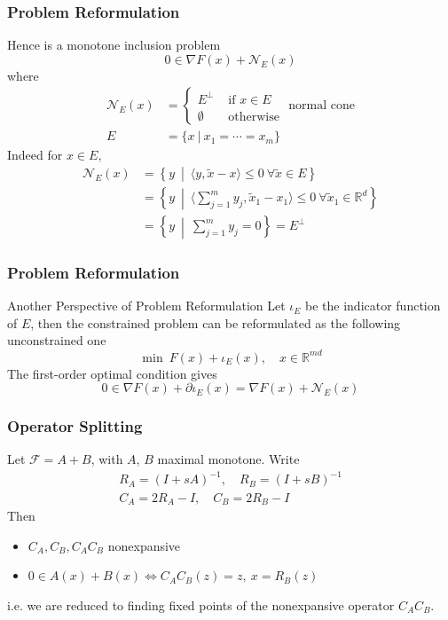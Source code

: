 
\begin{frame}
\frametitle{Problem Reformulation}

Hence is a monotone inclusion problem
$$0 \in \nabla F(x) + \mathcal{N}_E(x)$$
where
\begin{align*}
\mathcal{N}_E(x) & = \begin{cases} E^{\perp} & \text{ if } x \in E \\ \emptyset & \text{ otherwise } \end{cases} \text{normal cone} \\
E & = \{x \ |\ x_1 = \cdots = x_m\}
\end{align*}
Indeed for $x\in E$,
\begin{align*}
\mathcal{N}_E(x) & = \left\{ y \ \middle|\ \langle y, \widetilde{x} - x \rangle \leqslant 0 \ \forall \widetilde{x} \in E \right\} \\
& = \left\{ y \ \middle|\ \langle \sum\nolimits_{j=1}^m y_j, \widetilde{x}_1 - x_1 \rangle \leqslant 0 \ \forall \widetilde{x}_1 \in \mathbb{R}^d \right\} \\
& = \left\{ y \ \middle|\ \sum\nolimits_{j=1}^m y_j = 0 \right\} = E^{\perp}
\end{align*}

\end{frame}


\begin{frame}
\frametitle{Problem Reformulation}

\begin{block}{Another Perspective of Problem Reformulation}
Let $\iota_E$ be the indicator function of $E$, then the constrained problem can be reformulated as the following unconstrained one
$$\min \ F(x) + \iota_E(x), \quad x \in \mathbb{R}^{md}$$
The first-order optimal condition gives
$$0 \in \nabla F(x) + \partial \iota_E(x) = \nabla F(x) + \mathcal{N}_E(x)$$
\end{block}

\end{frame}


\begin{frame}
\frametitle{Operator Splitting}

Let $\mathcal{F} = A+B$, with $A$, $B$ maximal monotone. Write
\begin{gather*}
R_A = (I + s A)^{-1}, \quad R_B = (I + s B)^{-1} \\
C_A = 2R_A - I, \quad C_B = 2R_B - I
\end{gather*}
Then
\begin{itemize}
    \item $C_A, C_B, C_AC_B$ nonexpansive
    \item $0\in A(x)+B(x) \Longleftrightarrow C_AC_B(z) = z, \ x = R_B(z)$
\end{itemize}
i.e. we are reduced to finding fixed points of the nonexpansive operator $ C_AC_B$.

\end{frame}

